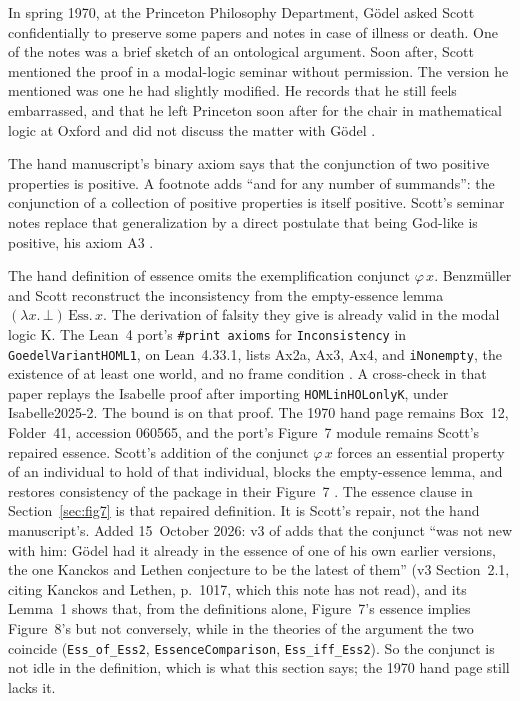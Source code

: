 \documentclass[11pt,a4paper]{article}
\newcommand{\lean}[1]{\texttt{#1}}
\theoremstyle{definition}
\theoremstyle{remark}
\begin{document}
In spring 1970, at the Princeton Philosophy Department, G\"odel asked Scott
confidentially to preserve some papers and notes in case of illness or death.
One of the notes was a brief sketch of an ontological argument.
Soon after, Scott mentioned the proof in a modal-logic seminar without
permission.
The version he mentioned was one he had slightly modified.
He records that he still feels embarrassed, and that he left Princeton soon
after for the chair in mathematical logic at Oxford and did not discuss the
matter with G\"odel \cite{benzmuellerScott2025}.

The hand manuscript's binary axiom says that the conjunction of two positive
properties is positive.
A footnote adds ``and for any number of summands'': the conjunction of a
collection of positive properties is itself positive.
Scott's seminar notes replace that generalization by a direct postulate that
being God-like is positive, his axiom A3
\cite{scott2004notes,benzmuellerScott2025}.

The hand definition of essence omits the exemplification conjunct
\(\varphi\,x\).
Benzm\"uller and Scott reconstruct the inconsistency from the empty-essence
lemma \((\lambda x.\,\bot)\,\mathrm{Ess.}\,x\).
The derivation of falsity they give is already valid in the modal logic K.
The Lean~4 port's \lean{\#print axioms} for \lean{Inconsistency} in
\lean{GoedelVariantHOML1}, on Lean~4.33.1, lists Ax2a, Ax3, Ax4, and
\lean{iNonempty}, the existence of at least one world, and no frame condition
\cite{benzmuellerLean2026}.
A cross-check in that paper replays the Isabelle proof after importing
\lean{HOMLinHOLonlyK}, under Isabelle2025-2.
The bound is on that proof.
The 1970 hand page remains Box~12, Folder~41, accession 060565, and the
port's Figure~7 module remains Scott's repaired essence.
Scott's addition of the conjunct \(\varphi\,x\) forces an essential property
of an individual to hold of that individual, blocks the empty-essence lemma,
and restores consistency of the package in their Figure~7
\cite{benzmuellerScott2025}.
The essence clause in Section~\ref{sec:fig7} is that repaired definition.
It is Scott's repair, not the hand manuscript's.
Added 15~October 2026: v3 of \cite{benzmuellerPWN2026} adds that the
conjunct ``was not new with him: G\"odel had it already in the essence of one
of his own earlier versions, the one Kanckos and Lethen conjecture to be the
latest of them'' (v3 Section~2.1, citing Kanckos and Lethen, p.~1017, which
this note has not read), and its Lemma~1 shows that, from the definitions
alone, Figure~7's essence implies Figure~8's but not conversely, while in the
theories of the argument the two coincide (\lean{Ess\_of\_Ess2},
\lean{EssenceComparison}, \lean{Ess\_iff\_Ess2}).
So the conjunct is not idle in the definition, which is what this section
says; the 1970 hand page still lacks it.
\end{document}
